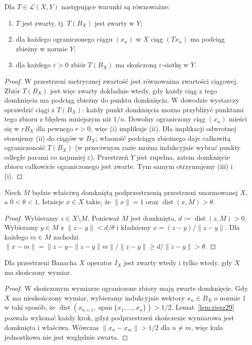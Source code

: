 \begin{twierdzenie}
\label{thm:compact-criteria29}
Dla $T\in\mathcal L(X,Y)$ następujące warunki są równoważne:
\begin{enumerate}[label=\textup{(\roman*)}]
\item $T$ jest zwarty, tj. $\overline{T(B_X)}$ jest zwarty w $Y$;
\item dla każdego ograniczonego ciągu $(x_n)$ w $X$ ciąg $(Tx_n)$
      ma podciąg zbieżny w normie $Y$;
\item dla każdego $\varepsilon>0$ zbiór $T(B_X)$ ma skończoną
      $\varepsilon$-siatkę w $Y$.
\end{enumerate}
\end{twierdzenie}
\begin{proof}
W przestrzeni metrycznej zwartość jest równoważna zwartości ciągowej.
Zbiór $\overline{T(B_X)}$ jest więc zwarty dokładnie wtedy,
gdy każdy ciąg z tego domknięcia ma podciąg zbieżny do punktu
domknięcia. W dowodzie wystarczy sprawdzić ciągi z $T(B_X)$:
każdy punkt domknięcia można przybliżyć punktami tego zbioru
z błędem mniejszym niż $1/n$.
Dowolny ograniczony ciąg $(x_n)$ mieści się w $rB_X$ dla pewnego
$r>0$, więc (i) implikuje (ii). Dla implikacji odwrotnej stosujemy
(ii) do ciągów w $B_X$; własność podciągu zbieżnego daje całkowitą
ograniczoność $T(B_X)$ (w przeciwnym razie można indukcyjnie
wybrać punkty odległe parami co najmniej $\varepsilon$).
Przestrzeń $Y$ jest zupełna, zatem domknięcie zbioru całkowicie
ograniczonego jest zwarte. Tym samym otrzymujemy (iii) i (i).
\end{proof}

\begin{lemat}
\label{lem:riesz29}
Niech $M$ będzie właściwą domkniętą podprzestrzenią przestrzeni
unormowanej $X$, a $0<\theta<1$. Istnieje $x\in X$ takie, że
$\|x\|=1$ oraz $\operatorname{dist}(x,M)>\theta$.
\end{lemat}
\begin{proof}
Wybieramy $z\in X\setminus M$. Ponieważ $M$ jest domknięta,
$d:=\operatorname{dist}(z,M)>0$. Wybieramy $y\in M$ z
$\|z-y\|<d/\theta$ i kładziemy $x=(z-y)/\|z-y\|$.
Dla każdego $m\in M$ zachodzi
$\|x-m\|=\|z-y-\|z-y\|m\|/\|z-y\|\ge d/\|z-y\|>\theta$.
\end{proof}

\begin{twierdzenie}
\label{thm:identity-compact29}
Dla przestrzeni Banacha $X$ operator $I_X$ jest zwarty wtedy
i tylko wtedy, gdy $X$ ma skończony wymiar.
\end{twierdzenie}
\begin{proof}
W skończonym wymiarze ograniczone zbiory mają zwarte domknięcie.
Gdy $X$ ma nieskończony wymiar, wybieramy indukcyjnie wektory
$x_n\in B_X$ o normie $1$ w taki sposób, że
$\operatorname{dist}(x_{n+1},\operatorname{span}\{x_1,\ldots,x_n\})>1/2$.
Lemat~\ref{lem:riesz29} pozwala wykonać każdy krok, gdyż
podprzestrzeń skończenie wymiarowa jest domknięta i właściwa.
Wówczas $\|x_n-x_m\|>1/2$ dla $n\ne m$, więc kula jednostkowa
nie jest względnie zwarta.
\end{proof}

